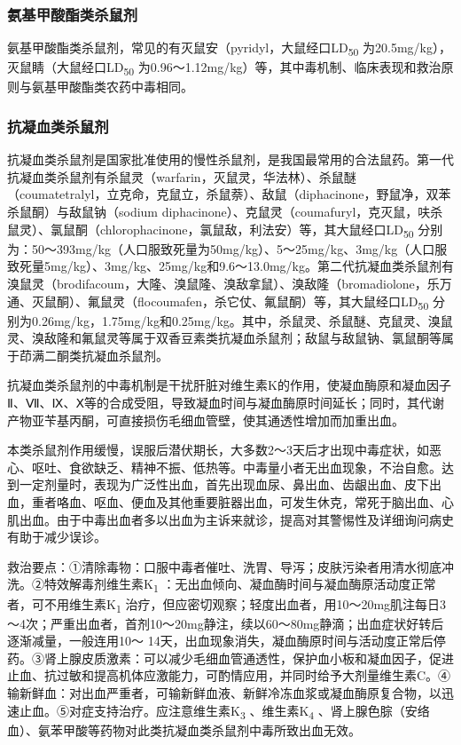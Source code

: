 \subsubsection{氨基甲酸酯类杀鼠剂}

氨基甲酸酯类杀鼠剂，常见的有灭鼠安（pyridyl，大鼠经口LD\textsubscript{50}
为20.5mg/kg），灭鼠睛（大鼠经口LD\textsubscript{50}
为0.96～1.12mg/kg）等，其中毒机制、临床表现和救治原则与氨基甲酸酯类农药中毒相同。

\subsubsection{抗凝血类杀鼠剂}

抗凝血类杀鼠剂是国家批准使用的慢性杀鼠剂，是我国最常用的合法鼠药。第一代抗凝血类杀鼠剂有杀鼠灵（warfarin，灭鼠灵，华法林）、杀鼠醚（coumatetralyl，立克命，克鼠立，杀鼠萘）、敌鼠（diphacinone，野鼠净，双苯杀鼠酮）与敌鼠钠（sodium
diphacinone）、克鼠灵（coumafuryl，克灭鼠，呋杀鼠灵）、氯鼠酮（chlorophacinone，氯鼠敌，利法安）等，其大鼠经口LD\textsubscript{50}
分别为：50～393mg/kg（人口服致死量为50mg/kg）、5～25mg/kg、3mg/kg（人口服致死量5mg/kg）、3mg/kg、25mg/kg和9.6～13.0mg/kg。第二代抗凝血类杀鼠剂有溴鼠灵（brodifacoum，大隆、溴鼠隆、溴敌拿鼠）、溴敌隆（bromadiolone，乐万通、灭鼠酮）、氟鼠灵（flocoumafen，杀它仗、氟鼠酮）等，其大鼠经口LD\textsubscript{50}
分别为0.26mg/kg，1.75mg/kg和0.25mg/kg。其中，杀鼠灵、杀鼠醚、克鼠灵、溴鼠灵、溴敌隆和氟鼠灵等属于双香豆素类抗凝血杀鼠剂；敌鼠与敌鼠钠、氯鼠酮等属于茚满二酮类抗凝血杀鼠剂。

抗凝血类杀鼠剂的中毒机制是干扰肝脏对维生素K的作用，使凝血酶原和凝血因子Ⅱ、Ⅶ、Ⅸ、Ⅹ等的合成受阻，导致凝血时间与凝血酶原时间延长；同时，其代谢产物亚苄基丙酮，可直接损伤毛细血管壁，使其通透性增加而加重出血。

本类杀鼠剂作用缓慢，误服后潜伏期长，大多数2～3天后才出现中毒症状，如恶心、呕吐、食欲缺乏、精神不振、低热等。中毒量小者无出血现象，不治自愈。达到一定剂量时，表现为广泛性出血，首先出现血尿、鼻出血、齿龈出血、皮下出血，重者咯血、呕血、便血及其他重要脏器出血，可发生休克，常死于脑出血、心肌出血。由于中毒出血者多以出血为主诉来就诊，提高对其警惕性及详细询问病史有助于减少误诊。

救治要点：①清除毒物：口服中毒者催吐、洗胃、导泻；皮肤污染者用清水彻底冲洗。②特效解毒剂维生素K\textsubscript{1}
：无出血倾向、凝血酶时间与凝血酶原活动度正常者，可不用维生素K\textsubscript{1}
治疗，但应密切观察；轻度出血者，用10～20mg肌注每日3～4次；严重出血者，首剂10～20mg静注，续以60～80mg静滴；出血症状好转后逐渐减量，一般连用10～
14天，出血现象消失，凝血酶原时间与活动度正常后停药。③肾上腺皮质激素：可以减少毛细血管通透性，保护血小板和凝血因子，促进止血、抗过敏和提高机体应激能力，可酌情应用，并同时给予大剂量维生素C。④输新鲜血：对出血严重者，可输新鲜血液、新鲜冷冻血浆或凝血酶原复合物，以迅速止血。⑤对症支持治疗。应注意维生素K\textsubscript{3}
、维生素K\textsubscript{4}
、肾上腺色腙（安络血）、氨苯甲酸等药物对此类抗凝血类杀鼠剂中毒所致出血无效。

